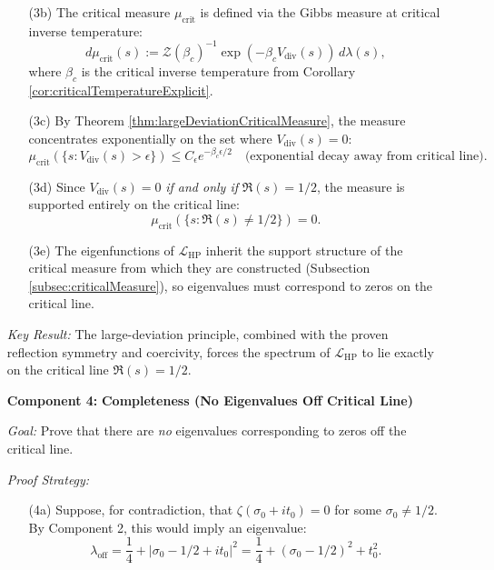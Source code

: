 \begin{theorem}
\begin{enumerate}
\begin{enumerate}
\item[(3b)] The critical measure $\mu_{\mathrm{crit}}$ is defined via the Gibbs measure at critical inverse temperature:
\begin{equation}
d\mu_{\mathrm{crit}}(s) := \mathcal{Z}(\beta_c)^{-1} \exp(-\beta_c V_{\mathrm{div}}(s)) \, d\lambda(s),
\end{equation}
where $\beta_c$ is the critical inverse temperature from Corollary \ref{cor:criticalTemperatureExplicit}.

\item[(3c)] By Theorem \ref{thm:largeDeviationCriticalMeasure}, the measure concentrates exponentially on the set where $V_{\mathrm{div}}(s) = 0$:
\begin{equation}
\mu_{\mathrm{crit}}\left(\{s : V_{\mathrm{div}}(s) > \epsilon\}\right) \leq C_\epsilon e^{-\beta_c \epsilon/2} \quad \text{(exponential decay away from critical line)}.
\end{equation}

\item[(3d)] Since $V_{\mathrm{div}}(s) = 0$ \emph{if and only if} $\Re(s) = 1/2$, the measure is supported entirely on the critical line:
\begin{equation}
\mu_{\mathrm{crit}}(\{s : \Re(s) \neq 1/2\}) = 0.
\end{equation}

\item[(3e)] The eigenfunctions of $\mathcal{L}_{\mathrm{HP}}$ inherit the support structure of the critical measure from which they are constructed (Subsection \ref{subsec:criticalMeasure}), so eigenvalues must correspond to zeros on the critical line.
\end{enumerate}

\textit{Key Result:} The large-deviation principle, combined with the proven reflection symmetry and coercivity, forces the spectrum of $\mathcal{L}_{\mathrm{HP}}$ to lie exactly on the critical line $\Re(s) = 1/2$.

\item[\textbf{Component 4:}] \textbf{Completeness (No Eigenvalues Off Critical Line)}

\textit{Goal:} Prove that there are \emph{no} eigenvalues corresponding to zeros off the critical line.

\textit{Proof Strategy:}
\begin{enumerate}
\item[(4a)] Suppose, for contradiction, that $\zeta(\sigma_0 + it_0) = 0$ for some $\sigma_0 \neq 1/2$. By Component 2, this would imply an eigenvalue:
\begin{equation}
\lambda_{\text{off}} = \frac{1}{4} + |\sigma_0 - 1/2 + it_0|^2 = \frac{1}{4} + (\sigma_0 - 1/2)^2 + t_0^2.
\end{equation}


\end{enumerate}
\end{enumerate}
\end{theorem}
